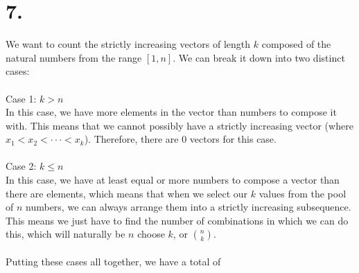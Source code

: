\documentclass{article}
\begin{document}
\section*{7.}
{\Large 

We want to count the strictly increasing vectors of length $k$ composed of the natural numbers from the range $[1, n]$. We can break it down into two distinct cases: \\ \\ 
Case 1: $k > n$ \\
In this case, we have more elements in the vector than numbers to compose it with. This means that we cannot possibly have a strictly increasing vector (where $x_1 < x_2 < \cdot \cdot \cdot < x_k$). Therefore, there are 0 vectors for this case. \\ \\
Case 2: $k \leq n$ \\ 
In this case, we have at least equal or more numbers to compose a vector than there are elements, which means that when we select our $k$ values from the pool of $n$ numbers, we can always arrange them into a strictly increasing subsequence. This means we just have to find the number of combinations in which we can do this, which will naturally be $n$ choose $k$, or $\binom{n}{k}$.
\\ \\
Putting these cases all together, we have a total of 

}
\end{document}

